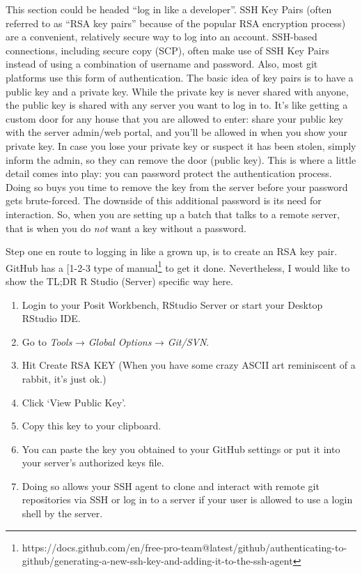 \documentclass[
  12pt,
  letterpaper,
]{krantz}
\providecommand{\tightlist}{%
  \setlength{\itemsep}{0pt}\setlength{\parskip}{0pt}}\usepackage{longtable,booktabs,array}
\begin{document}
This section could be headed ``log in like a developer''. SSH
Key Pairs (often referred to as ``RSA key pairs'' because of
the popular RSA encryption process) are a convenient, relatively secure
way to log into an account. SSH-based connections, including secure copy
(SCP), often make use of SSH Key Pairs instead of using a combination of
username and password. Also, most git platforms use this form of
authentication. The basic idea of key pairs is to have a public key and
a private key. While the private key is never shared with anyone, the
public key is shared with any server you want to log in to. It's like
getting a custom door for any house that you are allowed to enter: share
your public key with the server admin/web portal, and you'll be allowed
in when you show your private key. In case you lose your private key or
suspect it has been stolen, simply inform the admin, so they can remove
the door (public key). This is where a little detail comes into play:
you can password protect the authentication process. Doing so buys you
time to remove the key from the server before your password gets
brute-forced. The downside of this additional password is its need for
interaction. So, when you are setting up a batch that talks to a remote
server, that is when you do \emph{not} want a key without a password.

Step one en route to logging in like a grown up, is to create an RSA key
pair. GitHub has a {[}1-2-3 type of manual\footnote{https://docs.github.com/en/free-pro-team@latest/github/authenticating-to-github/generating-a-new-ssh-key-and-adding-it-to-the-ssh-agent}
to get it done. Nevertheless, I would like to show the TL;DR R Studio
(Server) specific way here.

\begin{enumerate}
\def\labelenumi{\arabic{enumi}.}
\tightlist
\item
  Login to your Posit Workbench, RStudio Server or start your Desktop
  RStudio IDE.
\item
  Go to \emph{Tools} → \emph{Global Options} → \emph{Git/SVN}.
\item
  Hit Create RSA KEY (When you have some crazy ASCII art reminiscent of
  a rabbit, it's just ok.)
\item
  Click `View Public Key'.
\item
  Copy this key to your clipboard.
\item
  You can paste the key you obtained to your GitHub
  settings or put it into your server's authorized keys file.
\item
  Doing so allows your SSH agent to clone and interact with remote git
  repositories via SSH or log in to a server if your user is allowed to
  use a login shell by the server.
\end{enumerate}
\end{document}
